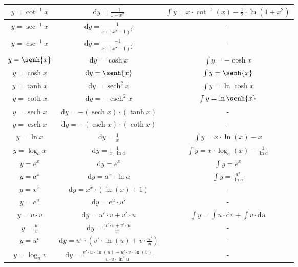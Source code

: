 \documentclass[11pt,twoside,a4paper]{article}
\DeclareMathOperator{\sech}{sech}
\DeclareMathOperator{\csch}{csch}
\begin{document}
\begin{tabular}{|c|c|c|}
\hline
$y = \cot^{-1}{x}$ & $\mathrm{d}y = \frac{-1}{1+x^2}$ & $\int{y} = x{\cdot}\cot^{-1}{(x)} + \frac{1}{2}{\cdot}\ln{(1+x^2)}$\\
\hline
$y = \sec^{-1}{x}$ & $\mathrm{d}y = \frac{1}{x{\cdot}(x^2-1)^{\frac{1}{2}}}$ & -\\
\hline
$y = \csc^{-1}{x}$ & $\mathrm{d}y = \frac{-1}{x{\cdot}(x^2-1)^{\frac{1}{2}}}$ & -\\
\hline
$y = \senh{x}$ & $\mathrm{d}y = \cosh{x}$ & $\int{y} = -\cosh{x}$\\
\hline
$y = \cosh{x}$ & $\mathrm{d}y = \senh{x}$ & $\int{y} = \senh{x}$\\
\hline
$y = \tanh{x}$ & $\mathrm{d}y = \sech^2{x}$ & $\int{y} = \ln{\cosh{x}}$\\
\hline
$y = \coth{x}$ & $\mathrm{d}y = -\csch^2{x}$ & $\int{y} = \ln{\senh{x}}$\\
\hline
$y = \sech{x}$ & $\mathrm{d}y = -(\sech{x})\cdot(\tanh{x})$ & -\\
\hline
$y = \csch{x}$ & $\mathrm{d}y = -(\csch{x})\cdot(\coth{x})$ & -\\
\hline
$y = \ln{x}$ & $\mathrm{d}y = \frac{1}{x}$ & $\int{y} = x{\cdot}\ln{(x)}-x$\\
\hline
$y = \log_a{x}$ & $\mathrm{d}y = \frac{1}{x{\cdot}\ln{a}}$ & $\int{y} = x{\cdot}\log_a{(x)}-\frac{1}{\ln{a}}$\\
\hline
$y = e^x$ & $\mathrm{d}y = e^x$ & $\int{y} = e^x$\\
\hline
$y = a^x$ & $\mathrm{d}y = a^x{\cdot}\ln{a}$ & $\int{y} = \frac{a^x}{\ln{a}}$\\
\hline
$y = x^x$ & $\mathrm{d}y = x^x{\cdot}(\ln{(x)}+1)$ & -\\
\hline
$y = e^u$ & $\mathrm{d}y = e^u{\cdot}u'$ & -\\
\hline
$y = u{\cdot}v$ & $\mathrm{d}y = u'{\cdot}v+v'{\cdot}u$ & $\int{y} = \int{u{\cdot}\mathrm{d}v} + \int{v{\cdot}\mathrm{d}u}$\\
\hline
$y = \frac{u}{v}$ & $\mathrm{d}y = \frac{u'{\cdot}v+v'{\cdot}u}{v^2}$ & -\\
\hline
$y = u^v$ & $\mathrm{d}y = u^v{\cdot}(v'{\cdot}\ln{(u)}+v{\cdot}\frac{u'}{u})$ & -\\
\hline
$y = \log_u{v}$ & $\mathrm{d}y = \frac{v'{\cdot}u{\cdot}\ln{(u)}-u'{\cdot}v{\cdot}\ln{(v)}}{v{\cdot}u{\cdot}\ln^2{u}}$ & -\\
\hline
\end{tabular}
\end{document}
